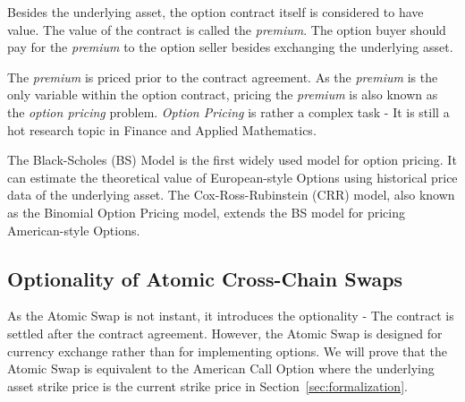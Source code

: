 Besides the underlying asset, the option contract itself is considered to have value.
The value of the contract is called the \textit{premium}.
The option buyer should pay for the \textit{premium} to the option seller besides exchanging the underlying asset.

The \textit{premium} is priced prior to the contract agreement.
As the \textit{premium} is the only variable within the option contract,
pricing the \textit{premium} is also known as the \textit{option pricing} problem.
\textit{Option Pricing} is rather a complex task - It is still a hot research topic in Finance and Applied Mathematics.

The Black-Scholes (BS) Model is the first widely used model for option pricing.
It can estimate the theoretical value of European-style Options using historical price data of the underlying asset.
The Cox-Ross-Rubinstein (CRR) model, also known as the Binomial Option Pricing model, extends the BS model for pricing American-style Options.

\subsection{Optionality of Atomic Cross-Chain Swaps}
As the Atomic Swap is not instant, it introduces the optionality - The contract is settled after the contract agreement.
However, the Atomic Swap is designed for currency exchange rather than for implementing options.
We will prove that the Atomic Swap is equivalent to the American Call Option
where the underlying asset strike price is the current strike price in Section~\ref{sec:formalization}.